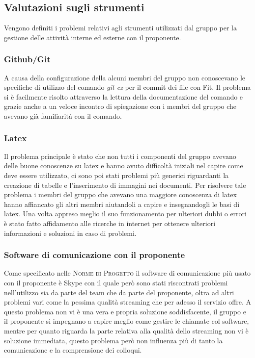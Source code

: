 \documentclass[../piano-di-qualifica.tex]{subfiles}
\begin{document}
\subsection{Valutazioni sugli strumenti}
\label{sub:valutazioni_strumenti}
Vengono definiti i problemi relativi agli strumenti utilizzati dal gruppo per la gestione delle attività interne ed esterne con il proponente.

\subsubsection{Github/Git}
\label{sub:github}
A causa della configurazione della  alcuni membri del gruppo non conoscevano le specifiche di utilizzo del comando \textit{git cz} per il commit dei file con Fit. Il problema si è facilmente risolto attraverso la lettura della documentazione del comando e grazie anche a un veloce incontro di spiegazione con i membri del gruppo che avevano già familiarità con il comando.

\subsubsection{Latex}
\label{sub:latex}
Il problema principale è stato che non tutti i componenti del gruppo avevano delle buone conoscenze su latex e hanno avuto difficoltà iniziali nel capire come deve essere utilizzato, ci sono poi stati problemi più generici riguardanti la creazione di tabelle e l'inserimento di immagini nei documenti.
Per risolvere tale problema i membri del gruppo che avevano una maggiore conoscenza di latex hanno affiancato gli altri membri aiutandoli a capire e insegnandogli le basi di latex. Una volta appreso meglio il suo funzionamento per ulteriori dubbi o errori è stato fatto affidamento alle ricerche in internet per ottenere ulteriori informazioni e soluzioni in caso di problemi.

\subsubsection{Software di comunicazione con il proponente}
\label{sub:latex}
Come specificato nelle \textsc{Norme di Progetto} il software di comunicazione più usato con il proponente è Skype con il quale però sono stati riscontrati problemi nell'utilizzo sia da parte del team che da parte del proponente, oltra ad altri problemi vari come la pessima qualità streaming che per adesso il servizio offre.
A questo problema non vi è una vera e propria soluzione soddisfacente, il gruppo e il proponente si impegnano a capire meglio come gestire le chiamate col software, mentre per quanto riguarda la parte relativa alla qualità dello streaming non vi è soluzione immediata, questo problema però non influenza più di tanto la comunicazione e la comprensione dei colloqui.
\end{document}
